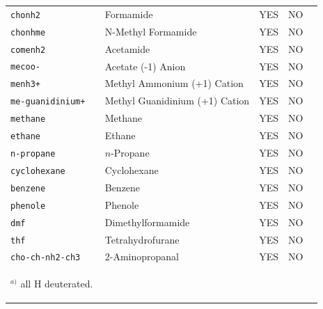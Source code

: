 \documentclass[b5paper,oneside,fleqn,11pt]{book}
\begin{document}
\begin{refsection}
\begin{landscape}
\begin{longtable}{ p{} p{} p{} p{} p{} }
 \tt{chonh2          } & Formamide                       & YES  &   NO     &                                          \\
 \tt{chonhme         } & N-Methyl Formamide              & YES  &   NO     &                                          \\
 \tt{comenh2         } & Acetamide                       & YES  &   NO     &                                          \\
 \tt{mecoo-          } & Acetate (-1) Anion              & YES  &   NO     &                                          \\
 \tt{menh3+          } & Methyl Ammonium (+1) Cation     & YES  &   NO     &                                          \\
 \tt{me-guanidinium+ } & Methyl Guanidinium (+1) Cation  & YES  &   NO     &                                          \\
 \tt{methane         } & Methane                         & YES  &   NO     &                                          \\
 \tt{ethane          } & Ethane                          & YES  &   NO     &                                          \\
 \tt{n-propane       } & $n$-Propane                     & YES  &   NO     &                                          \\
 \tt{cyclohexane     } & Cyclohexane                     & YES  &   NO     &                                          \\
 \tt{benzene         } & Benzene                         & YES  &   NO     &                                          \\
 \tt{phenole         } & Phenole                         & YES  &   NO     &                                          \\
 \tt{dmf             } & Dimethylformamide               & YES  &   NO     &                                          \\
 \tt{thf             } & Tetrahydrofurane                & YES  &   NO     &                                          \\
 \tt{cho-ch-nh2-ch3  } & 2-Aminopropanal                 & YES  &   NO     &                                          \\
\hline\hline
%
\multicolumn{5}{l}{
\begin{footnotesize}
$^{a)}$ all H deuterated.
\end{footnotesize}
}
\end{longtable}
\end{landscape}
%




\end{refsection}
\end{document}
